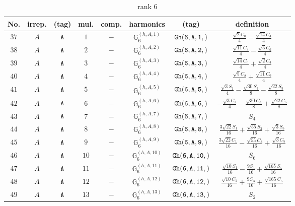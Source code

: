 \documentclass[fleqn,8pt]{jsarticle}
\begin{document}
\begin{table}[ht!]
\begin{center}
\caption{rank 6}
\renewcommand{\arraystretch}{1.3}
\begin{tabular}{cccccccc} \hline \hline
No. & irrep. & (tag) & mul. & comp. & harmonics & (tag) & definition \\ \hline
$ 37 $ & $ A $ & $ {\tt A} $ & $ 1 $ & $ - $ & $ \mathbb{G}_{6}^{(h,A,1)} $ & $ {\tt Gh(6,A,1,)} $ & $ \frac{\sqrt{2} C_{0}}{4} - \frac{\sqrt{14} C_{4}}{4} $ \\
$ 38 $ & $ A $ & $ {\tt A} $ & $ 2 $ & $ - $ & $ \mathbb{G}_{6}^{(h,A,2)} $ & $ {\tt Gh(6,A,2,)} $ & $ \frac{\sqrt{11} C_{2}}{4} - \frac{\sqrt{5} C_{6}}{4} $ \\
$ 39 $ & $ A $ & $ {\tt A} $ & $ 3 $ & $ - $ & $ \mathbb{G}_{6}^{(h,A,3)} $ & $ {\tt Gh(6,A,3,)} $ & $ \frac{\sqrt{14} C_{0}}{4} + \frac{\sqrt{2} C_{4}}{4} $ \\
$ 40 $ & $ A $ & $ {\tt A} $ & $ 4 $ & $ - $ & $ \mathbb{G}_{6}^{(h,A,4)} $ & $ {\tt Gh(6,A,4,)} $ & $ \frac{\sqrt{5} C_{2}}{4} + \frac{\sqrt{11} C_{6}}{4} $ \\
$ 41 $ & $ A $ & $ {\tt A} $ & $ 5 $ & $ - $ & $ \mathbb{G}_{6}^{(h,A,5)} $ & $ {\tt Gh(6,A,5,)} $ & $ \frac{\sqrt{3} S_{1}}{4} - \frac{\sqrt{30} S_{3}}{8} - \frac{\sqrt{22} S_{5}}{8} $ \\
$ 42 $ & $ A $ & $ {\tt A} $ & $ 6 $ & $ - $ & $ \mathbb{G}_{6}^{(h,A,6)} $ & $ {\tt Gh(6,A,6,)} $ & $ - \frac{\sqrt{3} C_{1}}{4} - \frac{\sqrt{30} C_{3}}{8} + \frac{\sqrt{22} C_{5}}{8} $ \\
$ 43 $ & $ A $ & $ {\tt A} $ & $ 7 $ & $ - $ & $ \mathbb{G}_{6}^{(h,A,7)} $ & $ {\tt Gh(6,A,7,)} $ & $ S_{4} $ \\
$ 44 $ & $ A $ & $ {\tt A} $ & $ 8 $ & $ - $ & $ \mathbb{G}_{6}^{(h,A,8)} $ & $ {\tt Gh(6,A,8,)} $ & $ \frac{3 \sqrt{22} S_{1}}{16} + \frac{\sqrt{55} S_{3}}{16} + \frac{\sqrt{3} S_{5}}{16} $ \\
$ 45 $ & $ A $ & $ {\tt A} $ & $ 9 $ & $ - $ & $ \mathbb{G}_{6}^{(h,A,9)} $ & $ {\tt Gh(6,A,9,)} $ & $ \frac{3 \sqrt{22} C_{1}}{16} - \frac{\sqrt{55} C_{3}}{16} + \frac{\sqrt{3} C_{5}}{16} $ \\
$ 46 $ & $ A $ & $ {\tt A} $ & $ 10 $ & $ - $ & $ \mathbb{G}_{6}^{(h,A,10)} $ & $ {\tt Gh(6,A,10,)} $ & $ S_{6} $ \\
$ 47 $ & $ A $ & $ {\tt A} $ & $ 11 $ & $ - $ & $ \mathbb{G}_{6}^{(h,A,11)} $ & $ {\tt Gh(6,A,11,)} $ & $ \frac{\sqrt{10} S_{1}}{16} - \frac{9 S_{3}}{16} + \frac{\sqrt{165} S_{5}}{16} $ \\
$ 48 $ & $ A $ & $ {\tt A} $ & $ 12 $ & $ - $ & $ \mathbb{G}_{6}^{(h,A,12)} $ & $ {\tt Gh(6,A,12,)} $ & $ \frac{\sqrt{10} C_{1}}{16} + \frac{9 C_{3}}{16} + \frac{\sqrt{165} C_{5}}{16} $ \\
$ 49 $ & $ A $ & $ {\tt A} $ & $ 13 $ & $ - $ & $ \mathbb{G}_{6}^{(h,A,13)} $ & $ {\tt Gh(6,A,13,)} $ & $ S_{2} $ \\
 \hline \hline
\end{tabular}
\end{center}
\end{table}
\end{document}
